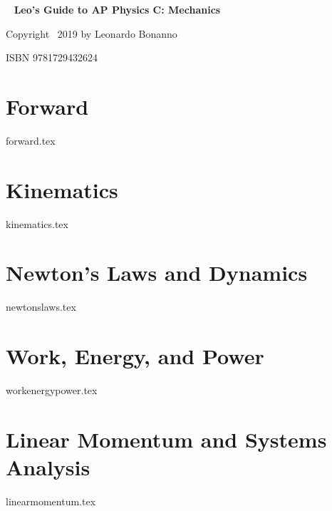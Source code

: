 \documentclass{article}[gray]
\numberwithin{equation}{subsection}
\begin{document}
\begin{center}
\
\newline
\newline
\newline
\newline
\newline
\newline
\newline
\newline
\newline
\newline
\newline
\textbf{\LARGE Leo's Guide to AP Physics C: Mechanics}
\end{center}
\begin{center}
Copyright \textcopyright \ 2019 by Leonardo Bonanno
\end{center}
\begin{center}
\footnotesize ISBN 9781729432624
\end{center}

\newpage
\tableofcontents
\newpage

\section{Forward}
{forward.tex}

\section{Kinematics}
{kinematics.tex}

\section{Newton's Laws and Dynamics}
{newtonslaws.tex}

\section{Work, Energy, and Power}
{workenergypower.tex}

\section{Linear Momentum and Systems Analysis}
{linearmomentum.tex}
\end{document}

